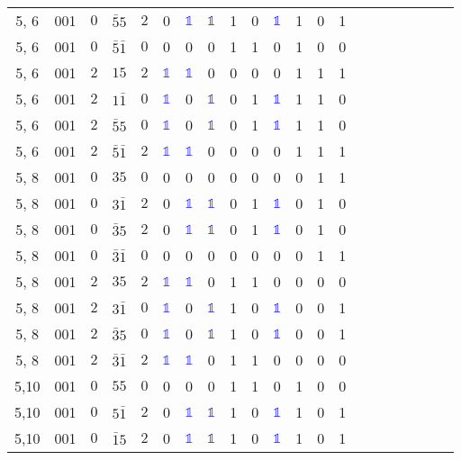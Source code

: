 \begin{longtable*}{c| cccccccccccccccccccc }
5, 6& 001& $0$& $\bar{5}5$& $2$& 0& \textcolor{blue}{$\mathds{1}$}& \textcolor{blue}{$\mathds{1}$}& 1& 0& \textcolor{blue}{$\mathds{1}$}& 1& 0& 1\\
5, 6& 001& $0$& $\bar{5}\bar{1}$& $0$& 0& 0& 0& 1& 1& 0& 1& 0& 0\\
5, 6& 001& $2$& $15$& $2$& \textcolor{blue}{$\mathds{1}$}& \textcolor{blue}{$\mathds{1}$}& 0& 0& 0& 0& 1& 1& 1\\
5, 6& 001& $2$& $1\bar{1}$& $0$& \textcolor{blue}{$\mathds{1}$}& 0& \textcolor{blue}{$\mathds{1}$}& 0& 1& \textcolor{blue}{$\mathds{1}$}& 1& 1& 0\\
5, 6& 001& $2$& $\bar{5}5$& $0$& \textcolor{blue}{$\mathds{1}$}& 0& \textcolor{blue}{$\mathds{1}$}& 0& 1& \textcolor{blue}{$\mathds{1}$}& 1& 1& 0\\
5, 6& 001& $2$& $\bar{5}\bar{1}$& $2$& \textcolor{blue}{$\mathds{1}$}& \textcolor{blue}{$\mathds{1}$}& 0& 0& 0& 0& 1& 1& 1\\
5, 8& 001& $0$& $35$& $0$& 0& 0& 0& 0& 0& 0& 0& 1& 1\\
5, 8& 001& $0$& $3\bar{1}$& $2$& 0& \textcolor{blue}{$\mathds{1}$}& \textcolor{blue}{$\mathds{1}$}& 0& 1& \textcolor{blue}{$\mathds{1}$}& 0& 1& 0\\
5, 8& 001& $0$& $\bar{3}5$& $2$& 0& \textcolor{blue}{$\mathds{1}$}& \textcolor{blue}{$\mathds{1}$}& 0& 1& \textcolor{blue}{$\mathds{1}$}& 0& 1& 0\\
5, 8& 001& $0$& $\bar{3}\bar{1}$& $0$& 0& 0& 0& 0& 0& 0& 0& 1& 1\\
5, 8& 001& $2$& $35$& $2$& \textcolor{blue}{$\mathds{1}$}& \textcolor{blue}{$\mathds{1}$}& 0& 1& 1& 0& 0& 0& 0\\
5, 8& 001& $2$& $3\bar{1}$& $0$& \textcolor{blue}{$\mathds{1}$}& 0& \textcolor{blue}{$\mathds{1}$}& 1& 0& \textcolor{blue}{$\mathds{1}$}& 0& 0& 1\\
5, 8& 001& $2$& $\bar{3}5$& $0$& \textcolor{blue}{$\mathds{1}$}& 0& \textcolor{blue}{$\mathds{1}$}& 1& 0& \textcolor{blue}{$\mathds{1}$}& 0& 0& 1\\
5, 8& 001& $2$& $\bar{3}\bar{1}$& $2$& \textcolor{blue}{$\mathds{1}$}& \textcolor{blue}{$\mathds{1}$}& 0& 1& 1& 0& 0& 0& 0\\
5,10& 001& $0$& $55$& $0$& 0& 0& 0& 1& 1& 0& 1& 0& 0\\
5,10& 001& $0$& $5\bar{1}$& $2$& 0& \textcolor{blue}{$\mathds{1}$}& \textcolor{blue}{$\mathds{1}$}& 1& 0& \textcolor{blue}{$\mathds{1}$}& 1& 0& 1\\
5,10& 001& $0$& $\bar{1}5$& $2$& 0& \textcolor{blue}{$\mathds{1}$}& \textcolor{blue}{$\mathds{1}$}& 1& 0& \textcolor{blue}{$\mathds{1}$}& 1& 0& 1\\

\end{longtable*}
